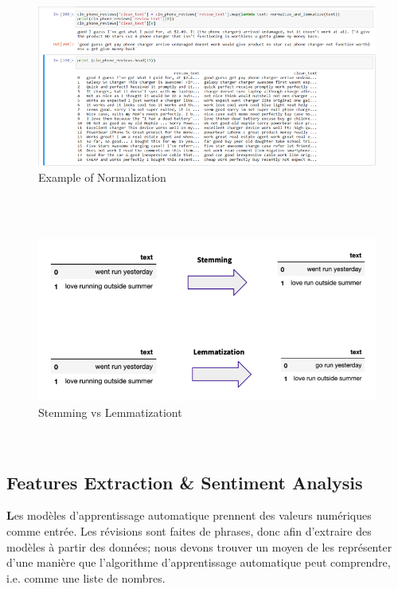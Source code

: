 \\
\begin{figure}[!htb] 
\begin{center} 
\includegraphics[scale=0.8]{pics/screens/8.png}
\end{center} 
\caption{Example of Normalization} 
\end{figure}  \FloatBarrier
\\
\\
\begin{figure}[!htb] 
\begin{center} 
\includegraphics[scale=0.9]{pics/screens/9.png}
\end{center} 
\caption{Stemming vs Lemmatizationt} 
\end{figure}  \FloatBarrier
\\
\subsection{Features Extraction & Sentiment Analysis }

\textbf Les modèles d’apprentissage automatique prennent des valeurs numériques comme entrée. Les révisions sont faites de phrases,
donc afin d’extraire des modèles à partir des données; nous devons trouver un moyen de les représenter d’une manière que
l’algorithme d’apprentissage automatique peut comprendre, i.e. comme une liste de nombres. \\

